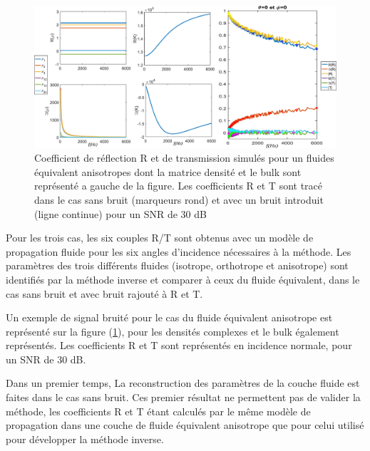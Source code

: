 \documentclass[12pt]{report}
\begin{document}
    \begin{figure}[ht!]
        \centering
        \includegraphics[scale=0.45]{RT_noise.pdf}
        \caption{Coefficient de réflection R et de transmission simulés pour un fluides équivalent anisotropes dont la matrice densité et le bulk sont représenté a gauche de la figure. Les coefficients R et T sont tracé dans le cas sans bruit (marqueurs rond) et avec un bruit introduit (ligne continue) pour un SNR de 30 dB}
        \label{RT_noise}
    \end{figure}
    
    Pour les trois cas, les six couples R/T sont obtenus avec un modèle de propagation fluide pour les six angles d'incidence nécessaires à la méthode. Les paramètres des trois différents fluides (isotrope, orthotrope et anisotrope) sont identifiés par la méthode inverse et comparer à ceux du fluide équivalent, dans le cas sans bruit et avec bruit rajouté à R et T. 
    
    Un exemple de signal bruité pour le cas du fluide équivalent anisotrope est représenté sur la figure (\ref{RT_noise}), pour les densités complexes et le bulk également représentés. Les coefficients R et T sont représentés en incidence normale, pour un SNR de 30 dB.  
    
    Dans un premier temps, La reconstruction des paramètres de la couche fluide  est faites dans le cas sans bruit. Ces premier résultat ne permettent pas de valider la méthode, les coefficients R et T étant calculés par le même modèle de propagation dans une couche de fluide équivalent anisotrope que pour celui utilisé pour développer la méthode inverse.  
\end{document}
